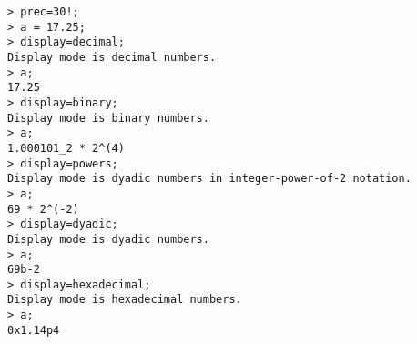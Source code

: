 \begin{center}\begin{minipage}{15cm}\begin{Verbatim}[frame=single]
> prec=30!;
> a = 17.25;
> display=decimal;
Display mode is decimal numbers.
> a;
17.25
> display=binary;
Display mode is binary numbers.
> a;
1.000101_2 * 2^(4)
> display=powers;
Display mode is dyadic numbers in integer-power-of-2 notation.
> a;
69 * 2^(-2)
> display=dyadic;
Display mode is dyadic numbers.
> a;
69b-2
> display=hexadecimal;
Display mode is hexadecimal numbers.
> a;
0x1.14p4
\end{Verbatim}
\end{minipage}\end{center}
